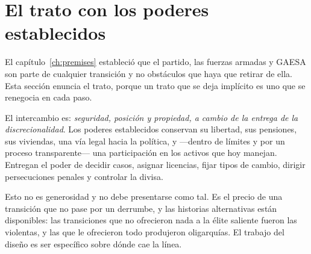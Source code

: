 \section{El trato con los poderes establecidos}

El capítulo~\ref{ch:premises} estableció que el partido, las fuerzas armadas y GAESA
son parte de cualquier transición y no obstáculos que haya que retirar de ella. Esta
sección enuncia el trato, porque un trato que se deja implícito es uno que se
renegocia en cada paso.

El intercambio es: \emph{seguridad, posición y propiedad, a cambio de la entrega de
la discrecionalidad}. Los poderes establecidos conservan su libertad, sus pensiones, sus
viviendas, una vía legal hacia la política, y ---dentro de límites y por un proceso
transparente--- una participación en los activos que hoy manejan. Entregan el poder
de decidir casos, asignar licencias, fijar tipos de cambio, dirigir persecuciones
penales y controlar la divisa.

Esto no es generosidad y no debe presentarse como tal. Es el precio de una
transición que no pase por un derrumbe, y las historias alternativas están
disponibles: las transiciones que no ofrecieron nada a la élite saliente fueron las
violentas, y las que le ofrecieron todo produjeron oligarquías. El trabajo del
diseño es ser específico sobre dónde cae la línea.

